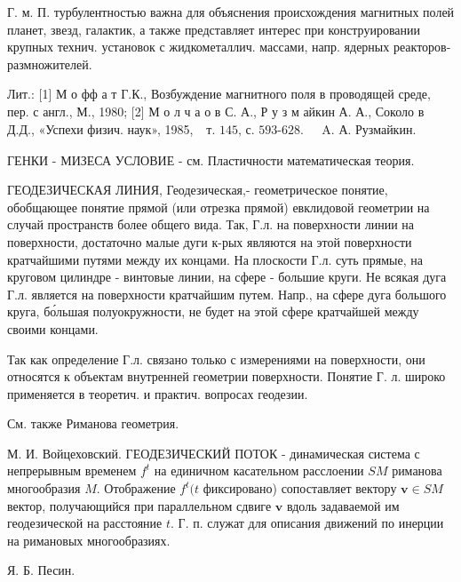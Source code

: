 \documentclass[10pt]{article}
\begin{document}
Г. м. П. турбулентностью важна для объяснения происхождения магнитных полей планет, звезд, галактик, а также представляет интерес при конструировании крупных технич. установок с жидкометаллич. массами, напр. ядерных реакторов-размножителей.



Лит.: [1] М о фф а т Г.К., Возбуждение магнитного поля в проводящей среде, пер. с англ., М., 1980; [2] М о л ч а о в С. А., Р у з м айкин А. А., Соколо в Д.Д., «Успехи физич. наук», 1985, $\begin{array}{ll}\text { т. } 145 \text {, с. 593-628. } & \text { A. А. Рузмайкин. }\end{array}$



ГЕНКИ - МИЗЕСА УСЛОВИЕ - см. Пластичности математическая теория.



ГЕОДЕЗИЧЕСКАЯ ЛИНИЯ, Геодезическая,- геометрическое понятие, обобщающее понятие прямой (или отрезка прямой) евклидовой геометрии на случай пространств более общего вида. Так, Г.л. на поверхности линии на поверхности, достаточно малые дуги к-рых являются на этой поверхности кратчайшими путями между их концами. На плоскости Г.л. суть прямые, на круговом цилиндре - винтовые линии, на сфере - большие круги. Не всякая дуга Г.л. является на поверхности кратчайшим путем. Напр., на сфере дуга большого круга, бо́льшая полуокружности, не будет на этой сфере кратчайшей между своими концами.



Так как определение Г.л. связано только с измерениями на поверхности, они относятся к объектам внутренней геометрии поверхности. Понятие Г. л. широко применяется в теоретич. и практич. вопросах геодезии.



См. также Риманова геометрия.



М. И. Войцеховский. ГЕОДЕЗИЧЕСКИЙ ПОТОК - динамическая система с непрерывным временем $f^{t}$ на единичном касательном расслоении $S M$ риманова многообразия $M$. Отображение $f^{t}(t$ фиксировано) сопоставляет вектору $\boldsymbol{v} \in S M$ вектор, получающийся при параллельном сдвиге $\boldsymbol{v}$ вдоль задаваемой им геодезической на расстояние $t$. Г. п. служат для описания движений по инерции на римановых многообразиях.



Я. Б. Песин.
\end{document}
